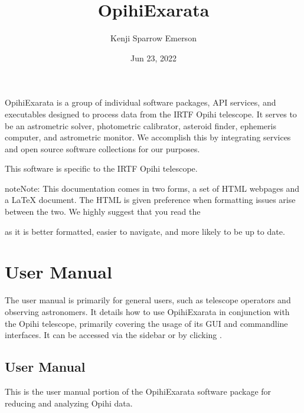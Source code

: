 \documentclass[letterpaper,11pt,english]{sphinxmanual}
\title{OpihiExarata}
\date{Jun 23, 2022}
\author{Kenji Sparrow Emerson}
\begin{document}
\pagestyle{empty}
\sphinxmaketitle
\pagestyle{plain}
\sphinxtableofcontents
\pagestyle{normal}
\label{\detokenize{index::doc}}


\sphinxAtStartPar
OpihiExarata is a group of individual software packages, API services, and
executables designed to process data from the IRTF Opihi telescope. It serves
to be an astrometric solver, photometric calibrator, asteroid finder,
ephemeris computer, and astrometric monitor. We accomplish this by integrating
services and open source software collections for our purposes.

\sphinxAtStartPar
This software is specific to the IRTF Opihi telescope.

\begin{sphinxadmonition}{note}{Note:}
\sphinxAtStartPar
This documentation comes in two forms, a set of HTML webpages and a LaTeX
document. The HTML is given preference when formatting issues arise between
the two. We highly suggest that you read the
%
\begin{footnote}[1]\sphinxAtStartFootnote
{}
%
\end{footnote} as it is
better formatted, easier to navigate, and more likely to be up to date.
\end{sphinxadmonition}


\chapter{User Manual}
\label{\detokenize{index:user-manual}}\label{\detokenize{index:home-user-manual}}
\sphinxAtStartPar
The user manual is primarily for general users, such as telescope operators and
observing astronomers. It details how to use OpihiExarata in conjunction with
the Opihi telescope, primarily covering the usage of its GUI and command\sphinxhyphen{}line
interfaces. It can be accessed via the sidebar or by clicking
{\hyperref[\detokenize{user/index::doc}]{}}.

\sphinxstepscope


\section{User Manual}
\label{\detokenize{user/index:user-manual}}\label{\detokenize{user/index:user-index}}\label{\detokenize{user/index::doc}}
\sphinxAtStartPar
This is the user manual portion of the OpihiExarata software package for
reducing and analyzing Opihi data.
\end{document}
